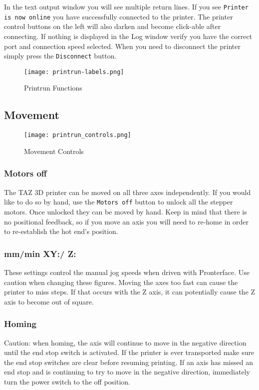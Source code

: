 In the text output window you will see multiple return lines. If you see \texttt{Printer is now online} you have successfully connected to the printer. The printer control buttons on the left will also darken and become click-able after connecting. If nothing is displayed in the Log window verify you have the correct port and connection speed selected. When you need to disconnect the printer simply press the \texttt{Disconnect} button.

\begin{figure}[H]
\centering
\texttt{[image: printrun-labels.png]}
\caption{Printrun Functions}
\label{fig:Printrun-labels}
\end{figure}

\subsection{Movement} 
\begin{figure}[H]
\centering
\texttt{[image: printrun\_controls.png]}
\caption{Movement Controls}
\label{fig:Printrun_controls}
\end{figure}

\subsubsection{Motors off}
The TAZ 3D printer can be moved on all three axes independently. If you would like to do so by hand, use the \texttt{Motors off} button to unlock all the stepper motors. Once unlocked they can be moved by hand. Keep in mind that there is no positional feedback, so if you move an axis you will need to re-home in order to re-establish the hot end's position. 

\subsubsection{mm/min XY:/ Z:}
These settings control the manual jog speeds when driven with Pronterface. Use caution when changing these figures. Moving the axes too fast can cause the printer to miss steps. If that occurs with the Z axis, it can potentially cause the Z axis to become out of square.

\subsubsection{Homing}
Caution: when homing, the axis will continue to move in the negative direction until the end stop switch is activated. If the printer is ever transported make sure the end stop switches are clear before resuming printing. If an axis has missed an end stop and is continuing to try to move in the negative direction, immediately turn the power switch to the off position. 

